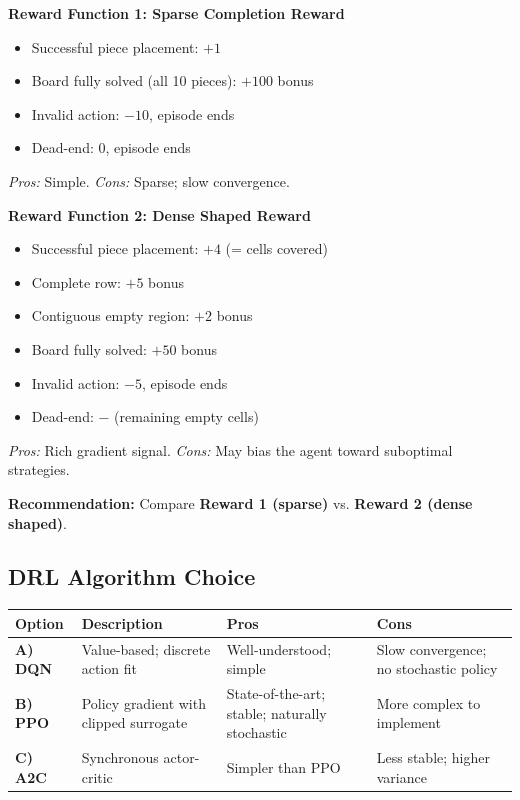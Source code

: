 \documentclass[11pt,a4paper]{article}
\begin{document}
\textbf{Reward Function 1: Sparse Completion Reward}
\begin{itemize}
    \item Successful piece placement: $+1$
    \item Board fully solved (all 10 pieces): $+100$ bonus
    \item Invalid action: $-10$, episode ends
    \item Dead-end: $0$, episode ends
\end{itemize}
\textit{Pros:} Simple. \textit{Cons:} Sparse; slow convergence.

\textbf{Reward Function 2: Dense Shaped Reward}
\begin{itemize}
    \item Successful piece placement: $+4$ (= cells covered)
    \item Complete row: $+5$ bonus
    \item Contiguous empty region: $+2$ bonus
    \item Board fully solved: $+50$ bonus
    \item Invalid action: $-5$, episode ends
    \item Dead-end: $-$ (remaining empty cells)
\end{itemize}
\textit{Pros:} Rich gradient signal. \textit{Cons:} May bias the agent toward suboptimal strategies.

\textbf{Recommendation:} Compare \textbf{Reward 1 (sparse)} vs. \textbf{Reward 2 (dense shaped)}.

\subsection{DRL Algorithm Choice}

\noindent
\begin{tabular}{|l|p{3.5cm}|p{3.5cm}|p{3.5cm}|}
\hline
\textbf{Option} & \textbf{Description} & \textbf{Pros} & \textbf{Cons} \\
\hline
\textbf{A) DQN} & Value-based; discrete action fit & Well-understood; simple & Slow convergence; no stochastic policy \\
\hline
\textbf{B) PPO} & Policy gradient with clipped surrogate & State-of-the-art; stable; naturally stochastic & More complex to implement \\
\hline
\textbf{C) A2C} & Synchronous actor-critic & Simpler than PPO & Less stable; higher variance \\
\hline
\end{tabular}
\end{document}
